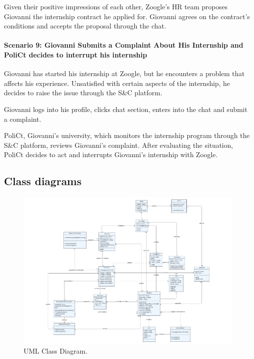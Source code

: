 Given their positive impressions of each other, Zoogle's HR team
proposes Giovanni the internship contract he applied for. Giovanni
agrees on the contract's conditions and accepts the proposal through the
chat.


\paragraph{Scenario 9: Giovanni Submits a Complaint About His Internship
and PoliCt decides to interrupt his internship}

Giovanni has started his internship at Zoogle, but he encounters a
problem that affects his experience. Unsatisfied with certain aspects of
the internship, he decides to raise the issue through the S\&C platform.

Giovanni logs into his profile, clicks chat section, enters into the
chat and submit a complaint.

PoliCt, Giovanni's university, which monitors the internship program
through the S\&C platform, reviews Giovanni's complaint.
After evaluating the situation, PoliCt decides to act and
interrupts Giovanni's internship with Zoogle.


\subsection{Class diagrams}
\label{subsec:class_diagrams}%


\begin{figure}[H]
    \begin{center}
        \includegraphics[width=\linewidth]{Images/ClassDiagram/UMLClass.pdf}
        \caption{UML Class Diagram.}
        \label{fig:UML_class_diag}%
    \end{center}
\end{figure}


